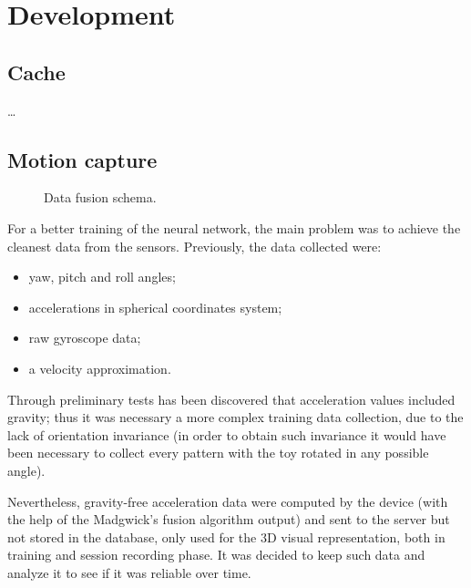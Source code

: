\section{Development}

\subsection{Cache}
\dots

\subsection{Motion capture}
\begin{center}
	\begin{figure}[ht!]
		\caption{Data fusion schema.}
	\end{figure}
\end{center}

For a better training of the neural network, the main problem was to achieve the cleanest data from the sensors. Previously, the data collected were:
\begin{itemize}
	\item yaw, pitch and roll angles;
	\item accelerations in spherical coordinates system;
	\item raw gyroscope data;
	\item a velocity approximation.
\end{itemize}
\bigbreak

Through preliminary tests has been discovered that acceleration values included gravity; thus it was necessary a more complex training data collection, due to the lack of orientation invariance (in order to obtain such invariance it would have been necessary to collect every pattern with the toy rotated in any possible angle).

Nevertheless, gravity-free acceleration data were computed by the device (with the help of the Madgwick's fusion algorithm output) and sent to the server but not stored in the database, only used for the 3D visual representation, both in training and session recording phase. It was decided to keep such data and analyze it to see if it was reliable over time.
\bigbreak


